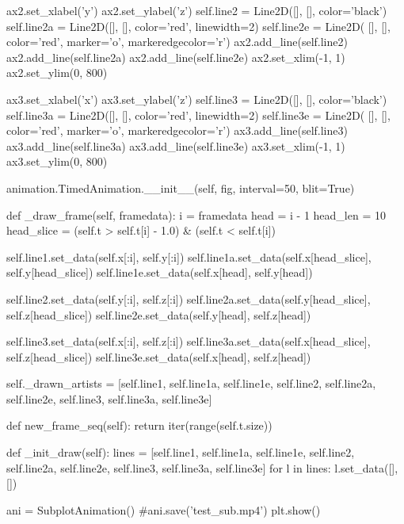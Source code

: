 \documentclass[12pt]{article}
\begin{document}
\begin{boxedverbatim}
ax2.set_xlabel('y')
        ax2.set_ylabel('z')
        self.line2 = Line2D([], [], color='black')
        self.line2a = Line2D([], [], color='red', linewidth=2)
        self.line2e = Line2D(
            [], [], color='red', marker='o', markeredgecolor='r')
        ax2.add_line(self.line2)
        ax2.add_line(self.line2a)
        ax2.add_line(self.line2e)
        ax2.set_xlim(-1, 1)
        ax2.set_ylim(0, 800)

        ax3.set_xlabel('x')
        ax3.set_ylabel('z')
        self.line3 = Line2D([], [], color='black')
        self.line3a = Line2D([], [], color='red', linewidth=2)
        self.line3e = Line2D(
            [], [], color='red', marker='o', markeredgecolor='r')
        ax3.add_line(self.line3)
        ax3.add_line(self.line3a)
        ax3.add_line(self.line3e)
        ax3.set_xlim(-1, 1)
        ax3.set_ylim(0, 800)

animation.TimedAnimation.__init__(self, fig, interval=50, blit=True)

def _draw_frame(self, framedata):
        i = framedata
        head = i - 1
        head_len = 10
        head_slice = (self.t > self.t[i] - 1.0) & (self.t < self.t[i])

        self.line1.set_data(self.x[:i], self.y[:i])
        self.line1a.set_data(self.x[head_slice], self.y[head_slice])
        self.line1e.set_data(self.x[head], self.y[head])

        self.line2.set_data(self.y[:i], self.z[:i])
        self.line2a.set_data(self.y[head_slice], self.z[head_slice])
        self.line2e.set_data(self.y[head], self.z[head])
\end{boxedverbatim}
\pagebreak

\begin{boxedverbatim}
        self.line3.set_data(self.x[:i], self.z[:i])
        self.line3a.set_data(self.x[head_slice], self.z[head_slice])
        self.line3e.set_data(self.x[head], self.z[head])

        self._drawn_artists = [self.line1, self.line1a, self.line1e,
                               self.line2, self.line2a, self.line2e,
                               self.line3, self.line3a, self.line3e]

    def new_frame_seq(self):
        return iter(range(self.t.size))

    def _init_draw(self):
        lines = [self.line1, self.line1a, self.line1e,
                 self.line2, self.line2a, self.line2e,
                 self.line3, self.line3a, self.line3e]
        for l in lines:
            l.set_data([], [])

ani = SubplotAnimation()
#ani.save('test_sub.mp4')
plt.show()
\end{boxedverbatim}
\pagebreak
\end{document}
